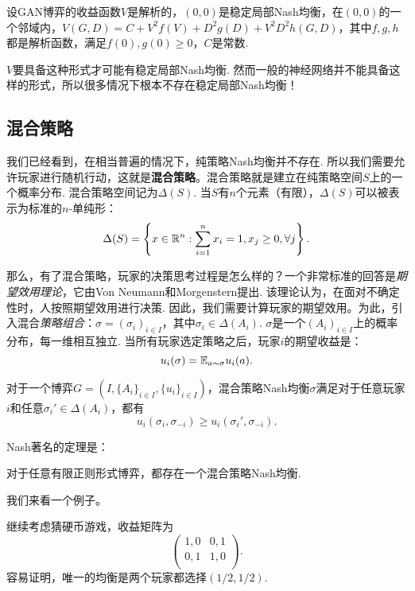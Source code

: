 \begin{theorem}
设GAN博弈的收益函数$V$是解析的，$(0,0)$是稳定局部Nash均衡，在$(0,0)$的一个邻域内，$V(G,D)=C+V^2f(V)+D^2g(D)+V^2D^2h(G,D)$，其中$f,g,h$都是解析函数，满足$f(0),g(0)\geq0 $，$C$是常数.
\end{theorem}

$V$要具备这种形式才可能有稳定局部Nash均衡. 然而一般的神经网络并不能具备这样的形式，所以很多情况下根本不存在稳定局部Nash均衡！

\subsection{混合策略}
我们已经看到，在相当普遍的情况下，纯策略Nash均衡并不存在. 所以我们需要允许玩家进行随机行动，这就是\textbf{混合策略}。混合策略就是建立在纯策略空间$S$上的一个概率分布. 混合策略空间记为$\Delta(S)$. 当$S$有$n$个元素（有限），$\Delta(S)$可以被表示为标准的$n$-单纯形：
    \[\Delta(S)=\left\{x\in\mathbb{R}^n:\sum_{i=1}^n x_i=1,x_j\geq 0,\forall j\right\}.\]

那么，有了混合策略，玩家的决策思考过程是怎么样的？一个非常标准的回答是\emph{期望效用理论}，它由Von Neumann和Morgenstern提出. 该理论认为，在面对不确定性时，人按照期望效用进行决策. 因此，我们需要计算玩家的期望效用。为此，引入混合\emph{策略组合}：$\sigma=(\sigma_i)_{i\in I}$，其中$\sigma_i\in\Delta(A_i)$. $\sigma$是一个$(A_i)_{i\in I}$上的概率分布，每一维相互独立. 当所有玩家选定策略之后，玩家$i$的期望收益是：
    \[u_i(\sigma)=\mathbb{E}_{a\sim\sigma} u_i(a).\]


\begin{definition}[Nash均衡]
对于一个博弈$G=(I,\{A_i\}_{i\in I},\{u_i\}_{i\in I})$，混合策略Nash均衡$\sigma$满足对于任意玩家$i$和任意$\sigma_i'\in \Delta(A_i)$，都有
\[u_i(\sigma_i,\sigma_{-i})\geq u_i(\sigma_i',\sigma_{-i}).\]
\end{definition}
Nash著名的定理是：
\begin{theorem}[Nash均衡存在性定理]
对于任意有限正则形式博弈，都存在一个混合策略Nash均衡.
\end{theorem}

我们来看一个例子。
\begin{example}
继续考虑猜硬币游戏，收益矩阵为
\[
\begin{pmatrix}
1,0&0,1\\
0,1&1,0\\
\end{pmatrix}.
\]
容易证明，唯一的均衡是两个玩家都选择$(1/2,1/2)$.
\end{example}

